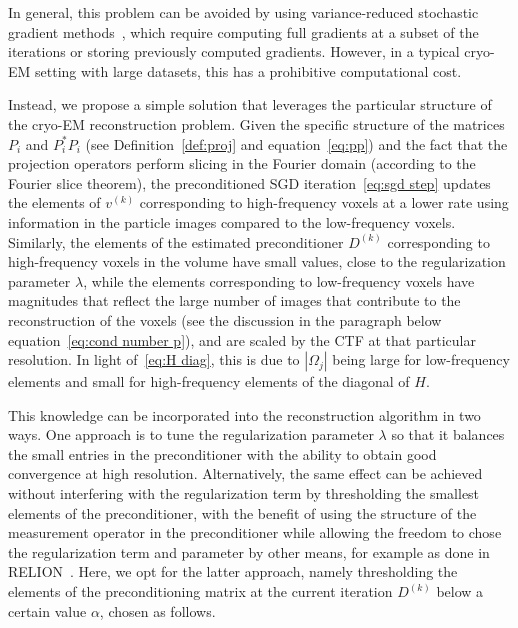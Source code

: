 \documentclass{article}
\begin{document}
In general, this problem can be avoided by using variance-reduced stochastic gradient 
methods~\cite{johnson_accelerating_2013,defazio_saga_2014}, which require computing 
full gradients at a subset of the iterations or storing previously computed gradients. 
However, in a typical cryo-EM setting with large datasets, this has a prohibitive 
computational cost.

Instead, we propose a simple solution that leverages the particular structure of 
the cryo-EM reconstruction problem. Given the specific structure of the matrices
$P_i$ and $P_i^*P_i$ (see Definition~\ref{def:proj} and equation~\eqref{eq:pp})
and the fact that the projection operators perform slicing in the Fourier domain
(according to the Fourier slice theorem), the preconditioned SGD iteration~\eqref{eq:sgd step} 
updates the elements of $v^{(k)}$ corresponding to high-frequency voxels at a
lower rate using information in the particle images compared to the low-frequency
voxels. Similarly, the elements of the estimated preconditioner $D^{(k)}$ corresponding 
to high-frequency voxels in the volume have small values, close to the regularization 
parameter $\lambda$, while the elements corresponding to low-frequency voxels have 
magnitudes that reflect the large number of images that contribute to the reconstruction 
of the voxels (see the discussion in the paragraph below equation~\eqref{eq:cond number p}), 
and are scaled by the CTF at that particular resolution. 
In light of~\eqref{eq:H diag}, this is due to $|\Omega_j|$ being large for low-frequency
elements and small for high-frequency elements of the diagonal of $H$.

This knowledge can be incorporated into the reconstruction algorithm in two ways.
One approach is to tune the regularization parameter $\lambda$ so that it balances 
the small entries in the preconditioner with the ability to obtain good convergence 
at high resolution. Alternatively, the same effect can be achieved without interfering 
with the regularization term by thresholding the smallest elements of the preconditioner, 
with the benefit of using the structure of the measurement operator in the preconditioner 
while allowing the freedom to chose the regularization term and parameter by other 
means, for example as done in RELION~\cite{scheres_relion_2012}.
Here, we opt for the latter approach, namely thresholding the elements of 
the preconditioning matrix at the current iteration $D^{(k)}$ below a certain 
value $\alpha$, chosen as follows.
\end{document}
